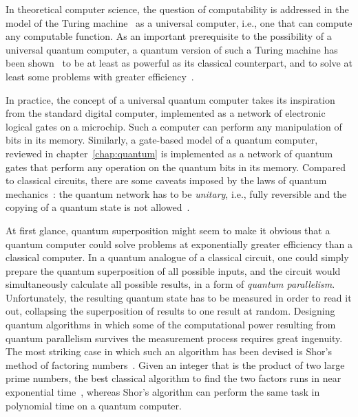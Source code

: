 In theoretical computer science, the question of computability is addressed in
the model of the Turing machine~\cite{TuringPLMS1937} as a universal computer,
i.e., one that can compute any computable function.
As an important prerequisite to the possibility of a universal quantum computer,
a quantum version of such a Turing machine has been shown~\cite{DeutschPRSA1985}
to be at least as powerful as its classical counterpart, and to solve
at least some problems with greater efficiency~\cite{KayeLaflammeMosca}.

In practice, the concept of a universal quantum computer takes its inspiration
from the standard digital computer, implemented as a network of electronic
logical gates on a microchip. Such a computer can perform any manipulation of
bits in its memory. Similarly, a gate-based model of a quantum computer,
reviewed in chapter~\ref{chap:quantum} is implemented as a network of quantum
gates that perform any operation on the quantum bits in its memory.
Compared to classical circuits, there are some caveats imposed by the laws of
quantum mechanics~\cite{NielsenChuang}: the quantum network has to be
\emph{unitary}, i.e., fully reversible and the copying of
a quantum state is not allowed~\cite{WoottersN1982}.

At first glance, quantum superposition might seem to make it obvious that
a quantum computer could solve problems at exponentially greater efficiency
than a classical computer. In a quantum analogue of a classical circuit, one could
simply prepare the quantum superposition of all possible inputs, and the circuit
would simultaneously calculate all possible results, in a form of \emph{quantum
parallelism}.
Unfortunately, the resulting quantum state has to be measured in order to read
it out, collapsing the superposition of results to one result at random.
Designing quantum algorithms in which some of the computational power resulting
from quantum parallelism survives the measurement process requires great
ingenuity.
The most striking case in which such an algorithm has been devised is Shor's
method of factoring numbers~\cite{ShorSJC1997}.
Given an integer that is the
product of two large prime numbers, the best classical algorithm to find the two
factors runs in near exponential time~\cite{PomeranceNAMS1996}, whereas Shor's
algorithm can perform the same task in polynomial time on a quantum computer.

